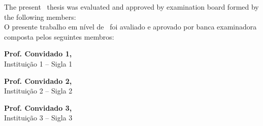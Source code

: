 \begin{folhadeaprovacao}
  \OnehalfSpacing
  \centering
  \begin{center}
    {\imprimirautor}

    \begin{center}
      \ABNTEXchapterfont\bfseries\MakeUppercase{\imprimirtitulo}\ifnotempty{\imprimirsubtitulo}{: \imprimirsubtitulo}
    \end{center}

    \begin{minipage}{\textwidth}
      \begin{center}
        \lang
        {
          The present \imprimirnivel~thesis was evaluated and approved by examination board formed
          by the following members:\\
        }
        {
          O presente trabalho em nível de \imprimirnivel~foi avaliado e
          aprovado por banca examinadora composta pelos seguintes membros:\\
        }
      \end{center}
    \end{minipage}%

    \vspace*{\baselineskip}
    \textbf{Prof. Convidado 1, } \\
    Instituição 1 -- Sigla 1

    \vspace*{\baselineskip}
    \textbf{Prof. Convidado 2, } \\
    Instituição 2 -- Sigla 2

    \vspace*{\baselineskip}
    \textbf{Prof. Convidado 3, } \\
    Instituição 3 -- Sigla 3


\end{center}
\end{folhadeaprovacao}
